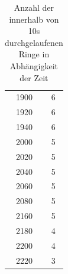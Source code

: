 \begin{table}
\begin{tabular}{c|c}
1900&	6\\ 

1920&	6\\ 

1940&	6\\ 

2000&	5\\ 

2020&	5\\ 

2040&	5\\ 

2060&	5\\ 

2080&	5\\ 

2160&	5\\ 

2180&	4\\ 

2200&	4\\ 

2220&	3\\ 

\end{tabular} 

\label{tbl_1}
\caption{Anzahl der innerhalb von 10s durchgelaufenen Ringe in Abhängigkeit der Zeit}
\end{table}

